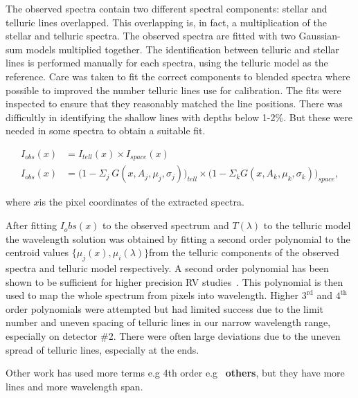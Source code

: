 The observed spectra contain two different spectral components: stellar and telluric lines overlapped. This overlapping is, in fact, a multiplication of the stellar and telluric spectra. The observed spectra are fitted with two Gaussian-sum models multiplied together. The identification between telluric and stellar lines is performed manually for each spectra, using the telluric model as the reference. Care was taken to fit the correct components to blended spectra where possible to improved the number telluric lines use for calibration. The fits were inspected to ensure that they reasonably matched the line positions. There was difficultly in identifying the shallow lines with depths below 1-2\%. But these were needed in some spectra to obtain a suitable fit.

\begin{align}
I_{obs}(x) &= I_{tell}(x) \times I_{space}(x) \nonumber \\
I_{obs}(x) &= \Big(1 - {\Sigma}_{j}\ G(x, A_{j}, {\mu}_{j}, {\sigma}_{j})\Big)_{tell} \times \Big(1 - {\Sigma}_{k} G(x, A_{k}, {\mu}_{k}, {\sigma}_{k})\Big)_{space}, \label{eqn:obs}
\end{align}

where \(x\)is the pixel coordinates of the extracted spectra.


After fitting \(I_obs(x)\) to the observed spectrum and \(T(\lambda)\) to the telluric model the wavelength solution was obtained by fitting a second order polynomial to the centroid values \(\{\mu_{j}(x), \mu_{i}(\lambda)\}\)from the telluric components of the observed spectra and telluric model respectively. A second order polynomial has been shown to be sufficient for higher precision RV studies~\citep[e.g.][]{bean_groundbased_2010, figueira_radial_2010}. This polynomial is then used to map the whole spectrum from pixels into wavelength. Higher \(3^{\textrm{rd}}\) and \(4^{\textrm{th}}\) order polynomials were attempted but had limited success due to the limit number and uneven spacing of telluric lines in our narrow wavelength range, especially on detector \#2. There were often large deviations due to the uneven spread of telluric lines, especially at the ends.

Other work has used more terms e.g 4th order e.g~\citep{piskorz_evidence_2016} \textbf{others}, but they have more lines and more wavelength span.

